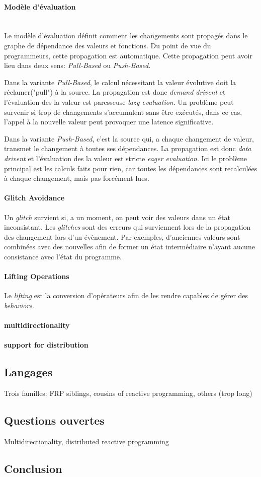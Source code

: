 \documentclass[11pt,twocolumn]{article}
\begin{document}
\paragraph{Modèle d'évaluation}~~\\
Le modèle d'évaluation définit comment les changements sont propagés dans le graphe de dépendance des valeurs et fonctions. Du point de vue du programmeurs, cette propagation est automatique. Cette propagation peut avoir lieu dans deux sens: \textit{Pull-Based} ou \textit{Push-Based}.

Dans la variante \textit{Pull-Based}, le calcul nécessitant la valeur évolutive doit la réclamer("pull") à la source. La propagation est donc \textit{demand drivent} et l'évaluation des la valeur est paresseuse \textit{lazy evaluation}. Un problème peut survenir si trop de changements s'accumulent sans être exécutés, dans ce cas, l'appel à la nouvelle valeur peut provoquer une latence significative.

Dans la variante \textit{Push-Based}, c'est la source qui, a chaque changement de valeur, transmet le changement à toutes ses dépendances. La propagation est donc \textit{data drivent} et l'évaluation des la valeur est stricte \textit{eager evaluation}. Ici le problème principal est les calculs faits pour rien, car toutes les dépendances sont recalculées à chaque changement, mais pas forcément lues.

\paragraph{Glitch Avoidance}
Un \textit{glitch} survient si, a un moment, on peut voir des valeurs dans un état inconsistant. Les \textit{glitches} sont des erreurs qui surviennent lors de la propagation des changement lors d'un évènement. Par exemples, d'anciennes valeurs sont combinées avec des nouvelles afin de former un état intermédiaire n'ayant aucune consistance avec l'état du programme.

\paragraph{Lifting Operations}
Le \textit{lifting} est la conversion d'opérateurs afin de les rendre capables de gérer des \textit{behaviors}.

\paragraph{multidirectionality}



\paragraph{support for distribution}

\subsection*{Langages}
Trois familles: FRP siblings, cousins of reactive programming, others (trop long)

\subsection*{Questions ouvertes}
Multidirectionality, distributed reactive programming 

\subsection*{Conclusion}
\end{document}
